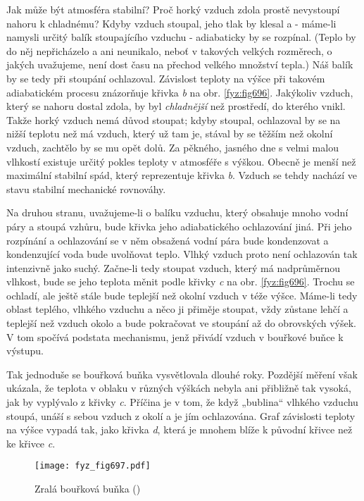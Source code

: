     Jak může být atmosféra stabilní? Proč horký vzduch zdola prostě nevystoupí nahoru k chladnému?
    Kdyby vzduch stoupal, jeho tlak by klesal a - máme-li namysli určitý balík stoupajícího vzduchu
    - adiabaticky by se rozpínal. (Teplo by do něj nepřicházelo a ani neunikalo, neboť v takových
    velkých rozměrech, o jakých uvažujeme, není dost času na přechod velkého množství tepla.) Náš
    balík by se tedy při stoupání ochlazoval. Závislost teploty na výšce při takovém adiabatickém
    procesu znázorňuje křivka \emph{b} na obr. \ref{fyz:fig696}. Jakýkoliv vzduch, který se nahoru
    dostal zdola, by byl \emph{chladnější} než prostředí, do kterého vnikl. Takže horký vzduch nemá
    důvod stoupat; kdyby stoupal, ochlazoval by se na nižší teplotu než má vzduch, který už tam je,
    stával by se těžším než okolní vzduch, zachtělo by se mu opět dolů. Za pěkného, jasného dne s
    velmi malou vlhkostí existuje určitý pokles teploty v atmosféře s výškou. Obecně je menší než
    maximální stabilní spád, který reprezentuje křivka \emph{b}. Vzduch se tehdy nachází ve stavu
    stabilní mechanické rovnováhy.

    Na druhou stranu, uvažujeme-li o balíku vzduchu, který obsahuje mnoho vodní páry a stoupá
    vzhůru, bude křivka jeho adiabatického ochlazování jiná. Při jeho rozpínání a ochlazování se v
    něm obsažená vodní pára bude kondenzovat a kondenzující voda bude uvolňovat teplo. Vlhký vzduch
    proto není ochlazován tak intenzivně jako suchý. Začne-li tedy stoupat vzduch, který má
    nadprůměrnou vlhkost, bude se jeho teplota měnit podle křivky \emph{c} na obr. \ref{fyz:fig696}.
    Trochu se ochladí, ale ještě stále bude teplejší než okolní vzduch v téže výšce. Máme-li tedy
    oblast teplého, vlhkého vzduchu a něco ji přiměje stoupat, vždy zůstane lehčí a teplejší než
    vzduch okolo a bude pokračovat ve stoupání až do obrovských výšek. V tom spočívá podstata
    mechanismu, jenž přivádí vzduch v bouřkové buňce k výstupu.

    Tak jednoduše se bouřková buňka vysvětlovala dlouhé roky. Pozdější měření však ukázala, že
    teplota v oblaku v různých výškách nebyla ani přibližně tak vysoká, jak by vyplývalo z křivky
    \emph{c}. Příčina je v tom, že když „bublina“ vlhkého vzduchu stoupá, unáší s sebou vzduch z
    okolí a je jím ochlazována. Graf závislosti teploty na výšce vypadá tak, jako křivka \emph{d},
    která je mnohem blíže k původní křivce než ke křivce \emph{c}.

    \begin{figure}[ht!] %
      \centering
      \texttt{[image: fyz\_fig697.pdf]}
      \caption{Zralá bouřková buňka (\cite[s.~707]{Feynman02})}
      \label{fyz:fig697}
    \end{figure}

